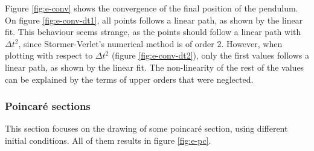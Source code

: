 \documentclass[a4paper,12pt,twoside]{article}
\begin{document}
Figure \ref{fig:e-conv} shows the convergence of the final position of the pendulum.
On figure \ref{fig:e-conv-dt1}, all points follows a linear path, as shown by the linear fit.
This behaviour seems strange, as the points should follow a linear path with $\Delta t^2$, since Stormer-Verlet's numerical method is of order 2.
However, when plotting with respect to $\Delta t^2$ (figure \ref{fig:e-conv-dt2}), only the first values follows a linear path, as shown by the linear fit.
The non-linearity of the rest of the values can be explained by the terms of upper orders that were neglected. %

\subsubsection{Poincaré sections}
This section focuses on the drawing of some poincaré section, using different initial conditions.
All of them results in figure \ref{fig:e-pc}.
\end{document}
